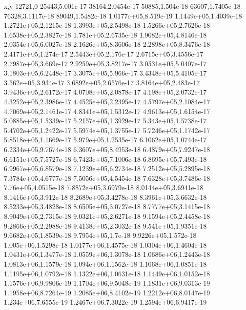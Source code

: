 x,y
12721,0
25443,5.001e-17
38164,2.0454e-17
50885,1.504e-18
63607,1.7405e-18
76328,3.1117e-18
89049,1.5482e-18
1.0177e+05,8.519e-19
1.1449e+05,1.4039e-18
1.2721e+05,2.1215e-18
1.3993e+05,2.5498e-18
1.5266e+05,2.7626e-18
1.6538e+05,2.3827e-18
1.781e+05,2.6735e-18
1.9082e+05,4.8146e-18
2.0354e+05,6.0027e-18
2.1626e+05,8.3606e-18
2.2898e+05,8.3476e-18
2.4171e+05,1.274e-17
2.5443e+05,2.176e-17
2.6715e+05,3.4556e-17
2.7987e+05,3.669e-17
2.9259e+05,3.8217e-17
3.0531e+05,5.0407e-17
3.1803e+05,6.2448e-17
3.3075e+05,5.966e-17
3.4348e+05,5.4105e-17
3.562e+05,3.934e-17
3.6892e+05,2.6576e-17
3.8164e+05,2.483e-17
3.9436e+05,2.6172e-17
4.0708e+05,2.0878e-17
4.198e+05,2.0732e-17
4.3252e+05,2.3986e-17
4.4525e+05,2.2395e-17
4.5797e+05,2.1084e-17
4.7069e+05,2.1461e-17
4.8341e+05,1.5312e-17
4.9613e+05,1.6154e-17
5.0885e+05,1.5339e-17
5.2157e+05,1.3929e-17
5.343e+05,1.5738e-17
5.4702e+05,1.2422e-17
5.5974e+05,1.3755e-17
5.7246e+05,1.1742e-17
5.8518e+05,1.1669e-17
5.979e+05,1.2535e-17
6.1062e+05,1.0744e-17
6.2334e+05,9.7674e-18
6.3607e+05,8.4953e-18
6.4879e+05,7.9247e-18
6.6151e+05,7.5727e-18
6.7423e+05,7.1006e-18
6.8695e+05,7.493e-18
6.9967e+05,6.8579e-18
7.1239e+05,6.2734e-18
7.2512e+05,5.2895e-18
7.3784e+05,4.6777e-18
7.5056e+05,4.5454e-18
7.6328e+05,3.7486e-18
7.76e+05,4.0515e-18
7.8872e+05,3.6979e-18
8.0144e+05,3.6941e-18
8.1416e+05,3.912e-18
8.2689e+05,3.4278e-18
8.3961e+05,3.6632e-18
8.5233e+05,3.4828e-18
8.6505e+05,3.0727e-18
8.7777e+05,3.1415e-18
8.9049e+05,2.7315e-18
9.0321e+05,2.6271e-18
9.1594e+05,2.4458e-18
9.2866e+05,2.2988e-18
9.4138e+05,2.3032e-18
9.541e+05,1.9351e-18
9.6682e+05,1.8539e-18
9.7954e+05,1.7e-18
9.9226e+05,1.572e-18
1.005e+06,1.5298e-18
1.0177e+06,1.4575e-18
1.0304e+06,1.4604e-18
1.0431e+06,1.3477e-18
1.0559e+06,1.3078e-18
1.0686e+06,1.2443e-18
1.0813e+06,1.1579e-18
1.094e+06,1.1562e-18
1.1068e+06,1.0851e-18
1.1195e+06,1.0792e-18
1.1322e+06,1.0631e-18
1.1449e+06,1.0152e-18
1.1576e+06,9.9806e-19
1.1704e+06,9.5048e-19
1.1831e+06,9.0313e-19
1.1958e+06,8.7264e-19
1.2085e+06,8.4102e-19
1.2212e+06,8.0147e-19
1.234e+06,7.6555e-19
1.2467e+06,7.3022e-19
1.2594e+06,6.9417e-19
